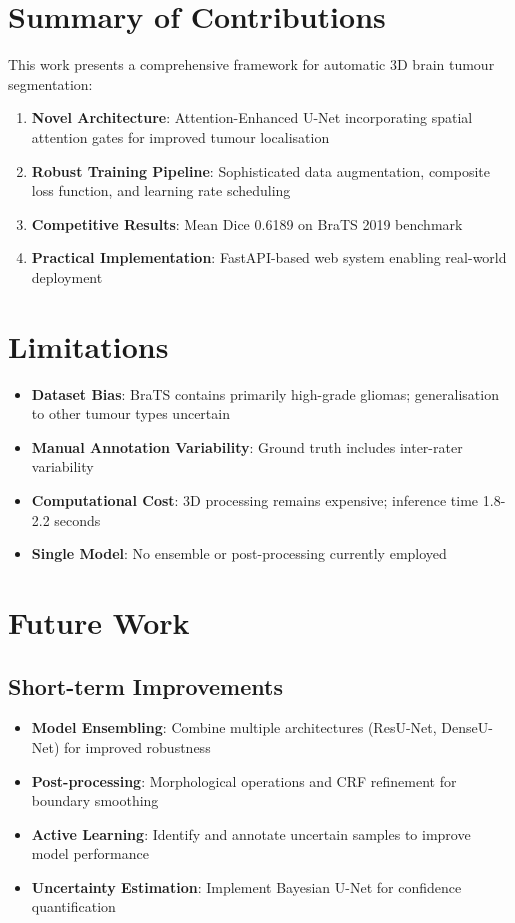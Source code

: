 \documentclass{ecsproject}     %
\begin{document}
\section{Summary of Contributions}

This work presents a comprehensive framework for automatic 3D brain tumour segmentation:

\begin{enumerate}
    \item \textbf{Novel Architecture}: Attention-Enhanced U-Net incorporating spatial attention gates for improved tumour localisation
    \item \textbf{Robust Training Pipeline}: Sophisticated data augmentation, composite loss function, and learning rate scheduling
    \item \textbf{Competitive Results}: Mean Dice 0.6189 on BraTS 2019 benchmark
    \item \textbf{Practical Implementation}: FastAPI-based web system enabling real-world deployment
\end{enumerate}

\section{Limitations}

\begin{itemize}
    \item \textbf{Dataset Bias}: BraTS contains primarily high-grade gliomas; generalisation to other tumour types uncertain
    \item \textbf{Manual Annotation Variability}: Ground truth includes inter-rater variability
    \item \textbf{Computational Cost}: 3D processing remains expensive; inference time 1.8-2.2 seconds
    \item \textbf{Single Model}: No ensemble or post-processing currently employed
\end{itemize}

\section{Future Work}

\subsection{Short-term Improvements}

\begin{itemize}
    \item \textbf{Model Ensembling}: Combine multiple architectures (ResU-Net, DenseU-Net) for improved robustness
    \item \textbf{Post-processing}: Morphological operations and CRF refinement for boundary smoothing
    \item \textbf{Active Learning}: Identify and annotate uncertain samples to improve model performance
    \item \textbf{Uncertainty Estimation}: Implement Bayesian U-Net for confidence quantification
\end{itemize}
\end{document}
